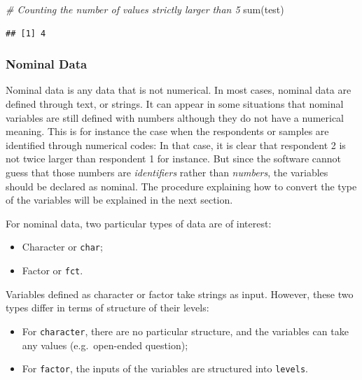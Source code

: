 \documentclass[
]{book}
\newenvironment{Shaded}{\begin{snugshade}}{\end{snugshade}}
\newcommand{\CommentTok}[1]{\textcolor[rgb]{0.56,0.35,0.01}{\textit{#1}}}
\newcommand{\FunctionTok}[1]{\textcolor[rgb]{0.00,0.00,0.00}{#1}}
\newcommand{\NormalTok}[1]{#1}
\providecommand{\tightlist}{%
  \setlength{\itemsep}{0pt}\setlength{\parskip}{0pt}}
\begin{document}
\begin{Shaded}
\begin{Highlighting}[]
\CommentTok{\# Counting the number of values strictly larger than 5}
\FunctionTok{sum}\NormalTok{(test)}
\end{Highlighting}
\end{Shaded}

\begin{verbatim}
## [1] 4
\end{verbatim}

\hypertarget{nominal-data}{%
\subsubsection{Nominal Data}\label{nominal-data}}

Nominal data is any data that is not numerical. In most cases, nominal data are defined through text, or strings. It can appear in some situations that nominal variables are still defined with numbers although they do not have a numerical meaning. This is for instance the case when the respondents or samples are identified through numerical codes: In that case, it is clear that respondent 2 is not twice larger than respondent 1 for instance. But since the software cannot guess that those numbers are \emph{identifiers} rather than \emph{numbers}, the variables should be declared as nominal. The procedure explaining how to convert the type of the variables will be explained in the next section.

For nominal data, two particular types of data are of interest:

\begin{itemize}
\tightlist
\item
  Character or \texttt{char};
\item
  Factor or \texttt{fct}.
\end{itemize}

Variables defined as character or factor take strings as input. However, these two types differ in terms of structure of their levels:

\begin{itemize}
\tightlist
\item
  For \texttt{character}, there are no particular structure, and the variables can take any values (e.g.~open-ended question);
\item
  For \texttt{factor}, the inputs of the variables are structured into \texttt{levels}.
\end{itemize}
\end{document}
